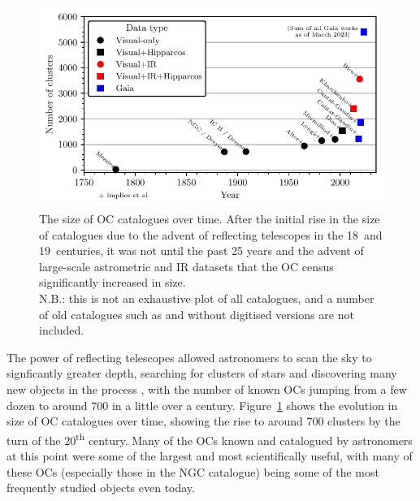 \begin{figure}[tb]
	\includegraphics[width=\textwidth]{fig/c1/catalogues.pdf}
	\caption[The size of OC catalogues over time]{The size of OC catalogues over time. After the initial rise in the size of catalogues due to the advent of reflecting telescopes in the 18\third\ and 19\third\ centuries, it was not until the past 25 years and the advent of large-scale astrometric and IR datasets that the OC census significantly increased in size. \\
	{\footnotesize N.B.: this is not an exhaustive plot of all catalogues, and a number of old catalogues such as \cite{herschel_catalogue_one_1786} and \cite{herschel_general_catalogue_1864} without digitised versions are not included.}}
	\label{fig:intro:history:catalogues}
\end{figure}

The power of reflecting telescopes allowed astronomers to scan the sky to signficantly greater depth, searching for clusters of stars and discovering many new objects in the process \citep[e.g.][]{herschel_catalogue_one_1786}, with the number of known OCs jumping from a few dozen to around 700 in a little over a century. Figure~\ref{fig:intro:history:catalogues} shows the evolution in size of OC catalogues over time, showing the rise to around 700 clusters by the turn of the 20\textsuperscript{th} century. Many of the OCs known and catalogued by astronomers at this point were some of the largest and most scientifically useful, with many of these OCs (especially those in the NGC catalogue) being some of the most frequently studied objects even today. 


